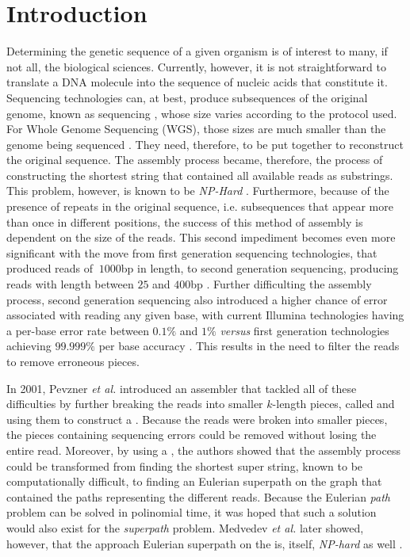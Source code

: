 \chapter{Introduction}

Determining the genetic sequence of a given organism is of interest to many, if not all, the biological sciences.  Currently, however, it is not straightforward to translate a DNA molecule into the sequence of nucleic acids that constitute it. Sequencing technologies can, at best, produce subsequences of the original genome, known as sequencing , whose size varies according to the protocol used. For Whole Genome Sequencing (WGS), those sizes are much smaller than the genome being sequenced \cite{Miller2010}. They need, therefore, to be put together to reconstruct the original sequence. The assembly process became, therefore, the process of constructing the shortest string that contained all available reads as substrings. This problem, however, is known to be \emph{NP-Hard} \cite{Gallant1980}. Furthermore, because of the presence of repeats in the original sequence, i.e. subsequences that appear more than once in different positions, the success of this method of assembly is dependent on the size of the reads. This second impediment becomes even more significant with the move from first generation sequencing technologies, that produced reads of $~1000$bp in length, to second generation sequencing, producing reads with length between $25$ and $400$bp \cite{Shendure2008}. Further difficulting the assembly process, second generation sequencing also introduced a higher chance of error associated with reading any given base, with current Illumina technologies having a per-base error rate between $0.1\%$ and $1\%$ \cite{Metzker2010} \emph{versus} first generation technologies achieving $99.999\%$ per base accuracy \cite{Shendure2008}. This results in the need to filter the reads to remove erroneous pieces.

In 2001, Pevzner \emph{et al.} \cite{Pevzner2001} introduced an assembler that tackled all of these difficulties by further breaking the reads into smaller $k$-length pieces, called  and using them to construct a \dBG. Because the reads were broken into smaller pieces, the pieces containing sequencing errors could be removed without losing the entire read. Moreover, by using a \dBG, the authors showed that the assembly process could be transformed from finding the shortest super string, known to be computationally difficult, to finding an Eulerian superpath on the graph that contained the paths representing the different reads. Because the Eulerian \emph{path} problem can be solved in polinomial time, it was hoped that such a solution would also exist for the \emph{superpath} problem. Medvedev \emph{et al.} later showed, however, that the approach Eulerian superpath on the \dBG is, itself, \emph{NP-hard} as well \cite{Medvedev2007}.

